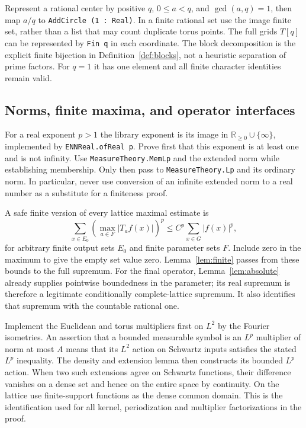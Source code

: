\documentclass[11pt,oneside]{article}
\theoremstyle{definition}\newtheorem{definition}[theorem]{Definition}
\theoremstyle{remark}\newtheorem{remark}[theorem]{Remark}
\newcommand{\ml}[1]{{\normalfont\small\nolinkurl{#1}}}
\begin{document}
Represent a rational center by positive $q$, $0\leq a<q$, and $\gcd(a,q)=1$,
then map $a/q$ to \ml{AddCircle (1 : Real)}. In a finite rational set use the
image finite set, rather than a list that may count duplicate torus points.
The full grids $T[q]$ can be represented by \ml{Fin q} in each coordinate.
The block decomposition is the explicit finite bijection in
Definition~\ref{def:blocks}, not a heuristic separation of prime factors.
For $q=1$ it has one element and all finite character identities remain valid.

\subsection{Norms, finite maxima, and operator interfaces}
For a real exponent $p>1$ the library exponent is its image in
$\mathbb R_{\geq0}\cup\{\infty\}$, implemented by \ml{ENNReal.ofReal p}.
Prove first that this exponent is at least one and is not infinity.
Use \ml{MeasureTheory.MemLp} and the extended norm while establishing
membership. Only then pass to \ml{MeasureTheory.Lp} and its ordinary norm.
In particular, never use conversion of an infinite extended norm to a real
number as a substitute for a finiteness proof.

A safe finite version of every lattice maximal estimate is
\[
 \sum_{x\in E_0}\left(\max_{a\in F}|T_a f(x)|\right)^p
             \leq C^p\sum_{x\in G}|f(x)|^p,
\]
for arbitrary finite output sets $E_0$ and finite parameter sets $F$.
Include zero in the maximum to give the empty set value zero.
Lemma~\ref{lem:finite} passes from these bounds to the full supremum.
For the final operator, Lemma~\ref{lem:absolute} already supplies pointwise
boundedness in the parameter; its real supremum is therefore a legitimate
conditionally complete-lattice supremum. It also identifies that supremum
with the countable rational one.

Implement the Euclidean and torus multipliers first on $L^2$ by the Fourier
isometries. An assertion that a bounded measurable symbol is an $L^p$
multiplier of norm at most $A$ means that its $L^2$ action on Schwartz inputs
satisfies the stated $L^p$ inequality. The density and extension lemma then
constructs its bounded $L^p$ action. When two such extensions agree on
Schwartz functions, their difference vanishes on a dense set and hence on
the entire space by continuity. On the lattice use finite-support functions
as the dense common domain. This is the identification used for all kernel,
periodization and multiplier factorizations in the proof.
\end{document}
